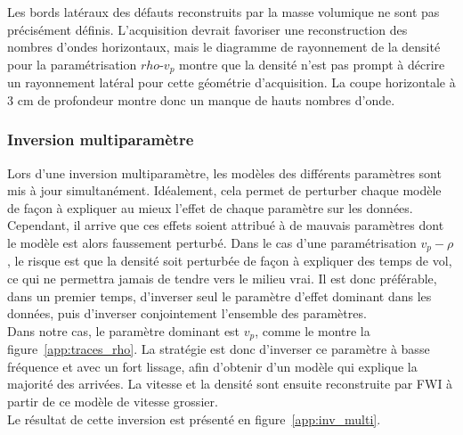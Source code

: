 Les bords latéraux des défauts reconstruits par la masse volumique ne sont pas précisément définis. L'acquisition devrait favoriser une reconstruction des nombres d'ondes horizontaux, mais le diagramme de rayonnement de la densité pour la paramétrisation $rho$-$v_{p}$ montre que la densité n'est pas prompt à décrire un rayonnement latéral pour cette géométrie d'acquisition. La coupe horizontale à 3 cm de profondeur montre donc un manque de hauts nombres d'onde. \\



\subsubsection{Inversion multiparamètre}

Lors d'une inversion multiparamètre, les modèles des différents paramètres sont mis à jour simultanément. Idéalement, cela permet de perturber chaque modèle de façon à expliquer au mieux l'effet de chaque paramètre sur les données. Cependant, il arrive que ces effets soient attribué à de mauvais paramètres dont le modèle est alors faussement perturbé. Dans le cas d'une paramétrisation $v_{p}-\rho$, le risque est que la densité soit perturbée de façon à expliquer des temps de vol, ce qui ne permettra jamais de tendre vers le milieu vrai. Il est donc préférable, dans un premier temps, d'inverser seul le paramètre d'effet dominant dans les données, puis d'inverser conjointement l'ensemble des paramètres.\\

 Dans notre cas, le paramètre dominant est $v_{p}$, comme le montre la figure~\ref{app:traces_rho}. La stratégie est donc d'inverser ce paramètre à basse fréquence et avec un fort lissage, afin d'obtenir d'un modèle qui explique la majorité des arrivées. La vitesse et la densité sont ensuite reconstruite par FWI à partir de ce modèle de vitesse grossier. \\
 
 Le résultat de cette inversion est présenté en figure~\ref{app:inv_multi}. 





